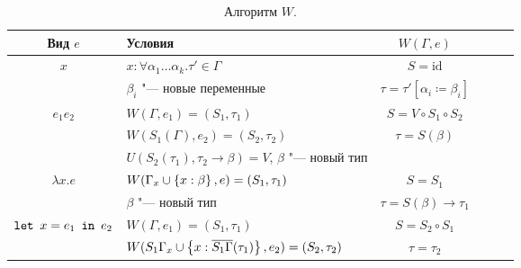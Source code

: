 \begin{table}[ht]
\centering
\begin{tabular}{Sl Sl Sl} \toprule
    Вид $e$ & Условия & $W(\Gamma, e)$ \\ \midrule
    $x$
        & $x : \forall \alpha_1 \ldots \alpha_k . \tau' \in \Gamma$ & $S =\mathrm{id}$ \\
        & $\beta_i$ "--- новые переменные                           & $\tau = \tau'[\alpha_i \coloneqq \beta_i]$ \\
        \midrule
    $e_1 e_2$
            & $W(\Gamma, e_1) = (S_1, \tau_1)$                                       & $S = V \circ S_1 \circ S_2$ \\
            & $W(S_1(\Gamma), e_2) = (S_2, \tau_2)$                                  & $\tau = S(\beta)$ \\
            & $U(S_2(\tau_1), \tau_2 \to \beta) = V$, $\beta$ "--- новый тип & \\ \midrule
    $\lambda x . e$
        & $W(\Gamma_x \cup \left\{x : \beta\right\}, e) = (S_1, \tau_1)$ & $S = S_1$  \\
        & $\beta$ "--- новый тип                                & $\tau = S(\beta) \to \tau_1$ \\ \midrule
    $\mathinner{\mathtt{let}}~x=e_1~\mathinner{\mathtt{in}}~e_2$
        & $W(\Gamma, e_1) = (S_1, \tau_1)$                                                     & $S = S_2 \circ S_1$ \\
        & $W(S_1 \Gamma_x \cup \left\{x : \overline{S_1 \Gamma} (\tau_1)\right\}, e_2) = (S_2, \tau_2)$ & $\tau = \tau_2$ \\ \bottomrule
\end{tabular}
\caption{Алгоритм $W$.}
\label{algorithm-w}
\end{table}

\begin{example}
\todo
\end{example}
